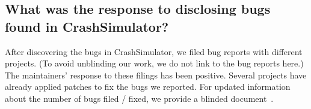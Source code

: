 %
%
%
%
%
%
\subsection{What was the response to disclosing bugs found in CrashSimulator?}
\label{sec-response}

After discovering the bugs in CrashSimulator, we filed bug reports with 
different projects.  (To avoid unblinding our work, we do not link to the 
bug reports here.)  The maintainers' response to these filings has been 
positive.  Several projects have already applied patches to fix the bugs
we reported.  For updated information about the number of bugs filed / fixed,
we provide a blinded document~.

